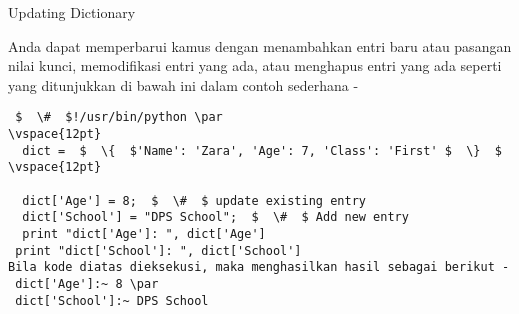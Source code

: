 \vspace{12pt}
\noindent
\vspace{\baselineskip}
Updating Dictionary \par
\noindent 
Anda dapat memperbarui kamus dengan menambahkan entri baru atau pasangan nilai kunci, memodifikasi entri yang ada, atau menghapus entri yang ada seperti yang ditunjukkan di bawah ini dalam contoh sederhana - \par
\noindent 
\vspace{12pt}
\vspace{\baselineskip}
\vspace{\baselineskip}
\begin{verbatim}
 $  \#  $!/usr/bin/python \par
\vspace{12pt} 
  dict =  $  \{  $'Name': 'Zara', 'Age': 7, 'Class': 'First' $  \}  $ 
\vspace{12pt}

  dict['Age'] = 8;  $  \#  $ update existing entry 
  dict['School'] = "DPS School";  $  \#  $ Add new entry  
  print "dict['Age']: ", dict['Age'] 
 print "dict['School']: ", dict['School'] 
Bila kode diatas dieksekusi, maka menghasilkan hasil sebagai berikut - 
 dict['Age']:~ 8 \par 
 dict['School']:~ DPS School 
 \end{verbatim}
 
